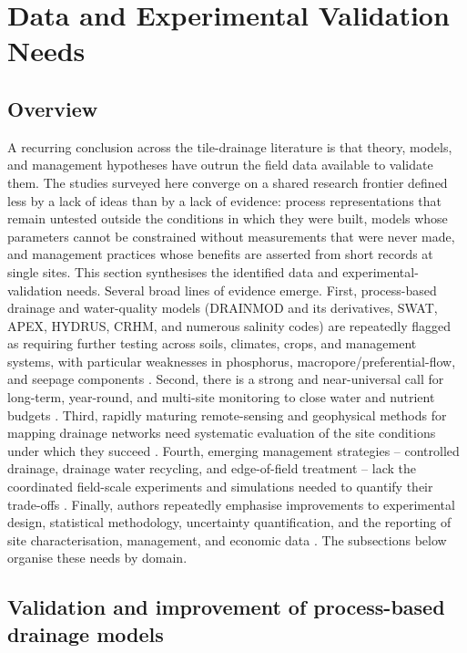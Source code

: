 \documentclass[11pt]{article}
\begin{document}
\section*{Data and Experimental Validation Needs}

\subsection{Overview}

A recurring conclusion across the tile-drainage literature is that theory,
models, and management hypotheses have outrun the field data available to
validate them. The studies surveyed here converge on a shared research
frontier defined less by a lack of ideas than by a lack of evidence: process
representations that remain untested outside the conditions in which they were
built, models whose parameters cannot be constrained without measurements that
were never made, and management practices whose benefits are asserted from
short records at single sites. This section synthesises the identified data and
experimental-validation needs. Several broad lines of evidence emerge. First,
process-based drainage and water-quality models (DRAINMOD and its derivatives,
SWAT, APEX, HYDRUS, CRHM, and numerous salinity codes) are repeatedly flagged as
requiring further testing across soils, climates, crops, and management systems,
with particular weaknesses in phosphorus, macropore/preferential-flow, and
seepage components \parencite{Youssef2006,Askar2021b,Askar2025,Radcliffe2015}.
Second, there is a strong and near-universal call for long-term, year-round, and
multi-site monitoring to close water and nutrient budgets
\parencite{Kladivko2001,Sharpley2019,Frankenberger2024}. Third, rapidly maturing
remote-sensing and geophysical methods for mapping drainage networks need
systematic evaluation of the site conditions under which they succeed
\parencite{Carlsen2024,Wienken2024}. Fourth, emerging management
strategies -- controlled drainage, drainage water recycling, and edge-of-field
treatment -- lack the coordinated field-scale experiments and simulations needed
to quantify their trade-offs \parencite{Hay2021,Youssef2018,Mendes2020}. Finally,
authors repeatedly emphasise improvements to experimental design, statistical
methodology, uncertainty quantification, and the reporting of site
characterisation, management, and economic data
\parencite{Pagliari2021,Singh2022b,Gates2002}. The subsections below organise
these needs by domain.

\subsection{Validation and improvement of process-based drainage models}
\end{document}
